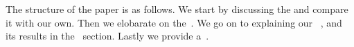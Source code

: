 The structure of the paper is as follows. We start by discussing the  and compare it with our own. Then we elobarate on the~. We go on to explaining our~ , and its results in the~ section. Lastly we provide a~.